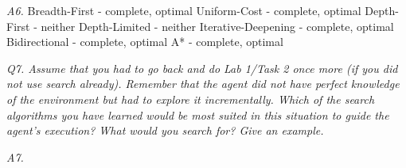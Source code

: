 \emph{A6.}
    Breadth-First - complete, optimal
    Uniform-Cost - complete, optimal
    Depth-First - neither
    Depth-Limited - neither
    Iterative-Deepening - complete, optimal
    Bidirectional - complete, optimal
    A* - complete, optimal


\em Q7. Assume that you had to go back and do Lab 1/Task 2 once more (if you did not use search already).
    Remember that the agent did not have perfect knowledge of the environment but had to explore it
    incrementally. Which of the search algorithms you have learned would be most suited in this situation
    to guide the agent's execution? What would you search for? Give an example.\em

\emph{A7.}
